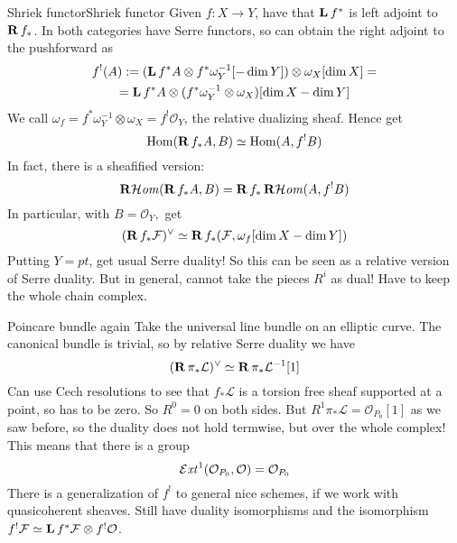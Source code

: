 
\begin{example}{Shriek functor}{Shriek functor} Given $f:X\rightarrow Y$, have that $\operatorname{\mathbf{L}} f^*$ is left adjoint to $\operatorname{\mathbf{R}} f_{*}$. In both categories have Serre functors, so can obtain the right adjoint to the pushforward as $$\begin{gathered}
f^!(A):=(\operatorname{\mathbf{L}} f^*A\otimes f^*\omega_{Y}^{-1}[-\dim Y])\otimes \omega_{X}[\dim X]=\\=\operatorname{\mathbf{L}} f^*A\otimes (f^*\omega_{Y}^{-1}\otimes \omega_{X})[\dim X -\dim Y]\end{gathered}$$
We call $\omega_{f}=f^*\omega_{Y}^{-1}\otimes \omega_{X}=f^!\mathcal{O}_{Y}$, the relative dualizing sheaf. Hence get $$\mathrm{Hom}(\operatorname{\mathbf{R}} f_{*}A, B)\simeq \mathrm{Hom}(A, f^!B)$$
In fact, there is a sheafified version: $$\operatorname{\mathbf{R}\mathcal{H}\mathit{om}}(\operatorname{\mathbf{R}} f_{*}A,B)=\operatorname{\mathbf{R}} f_{*}\operatorname{\mathbf{R}\mathcal{H}\mathit{om}}(A,f^!B)$$
In particular, with $B=\mathcal{O}_{Y},$ get $$(\operatorname{\mathbf{R}} f_{*}\mathcal{F})^\lor\simeq \operatorname{\mathbf{R}} f_{*}(\mathcal{F}, \omega_{f}[\dim X-\dim Y])$$
Putting $Y=pt$, get usual Serre duality! So this can be seen as a relative version of Serre duality. But in general, cannot take the pieces $R^i$ as dual! Have to keep the whole chain complex.
\end{example}

\begin{example}{Poincare bundle again}{} Take the universal line bundle on an elliptic curve. The canonical bundle is trivial, so by relative Serre duality we have $$(\operatorname{\mathbf{R}} \pi_{*}\mathcal{L})^\lor\simeq \operatorname{\mathbf{R}} \pi_{*}\mathcal{L}^{-1}[1]$$Can use Cech resolutions to see that $f_*\mathcal{L}$ is a torsion free sheaf supported at a point, so has to be zero. So $R^0=0$ on both sides. But $R^1\pi_{*}\mathcal{L}=\mathcal{O}_{P_{0}}[1]$ as we saw before, so the duality does not hold termwise, but over the whole complex! This means that there is a group $$\operatorname{\mathcal{E}\mathit{xt}}^1(\mathcal{O}_{P_{0}}, \mathcal{O})=\mathcal{O}_{P_{0}}$$There is a generalization of $f^!$ to general nice schemes, if we work with quasicoherent sheaves. Still have duality isomorphisms and the isomorphism $f^!\mathcal{F}\simeq \operatorname{\mathbf{L}} f^*\mathcal{F}\otimes f^!\mathcal{O}$. \end{example}

